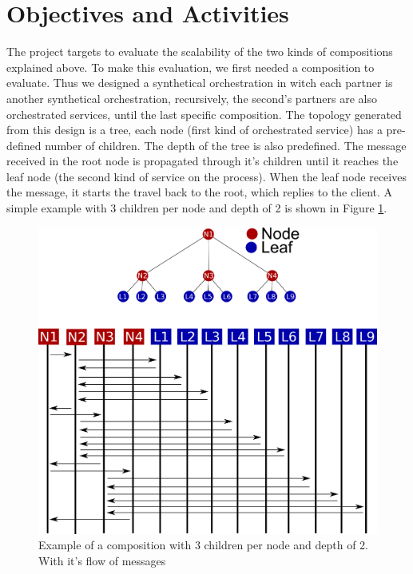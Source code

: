 \section{Objectives and Activities}

The project targets to evaluate the scalability of the two kinds of compositions explained above. To make this evaluation, we first needed a composition to evaluate. Thus we designed a synthetical orchestration in witch each partner is another synthetical orchestration, recursively, the second's partners are also orchestrated services, until the last specific composition. The topology generated from this design is a tree, each node (first kind of orchestrated service) has a pre-defined number of children. The depth of the tree is also predefined. The message received in the root node is propagated through it's children until it reaches the leaf node (the second kind of service on the process). When the leaf node receives the message, it starts the travel back to the root, which replies to the client. A simple example with 3 children per node and depth of 2 is shown in Figure \ref{synthetical-example}.

\begin{figure}[htb]
	\centering
	\includegraphics[width=\textwidth]{images/synthetical-example}
	\caption{Example of a composition with 3 children per node and depth of 2. With it's flow of messages}
	\label{synthetical-example}
\end{figure}

